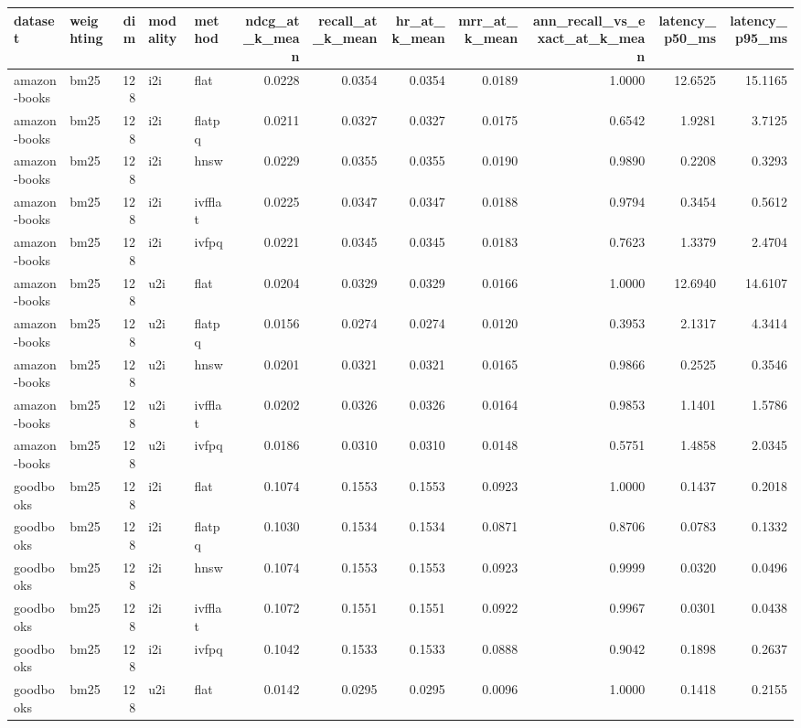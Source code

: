 \begin{tabular}{llrllrrrrrrr}
\toprule
dataset & weighting & dim & modality & method & ndcg_at_k_mean & recall_at_k_mean & hr_at_k_mean & mrr_at_k_mean & ann_recall_vs_exact_at_k_mean & latency_p50_ms & latency_p95_ms \\
\midrule
amazon-books & bm25 & 128 & i2i & flat & 0.0228 & 0.0354 & 0.0354 & 0.0189 & 1.0000 & 12.6525 & 15.1165 \\
amazon-books & bm25 & 128 & i2i & flatpq & 0.0211 & 0.0327 & 0.0327 & 0.0175 & 0.6542 & 1.9281 & 3.7125 \\
amazon-books & bm25 & 128 & i2i & hnsw & 0.0229 & 0.0355 & 0.0355 & 0.0190 & 0.9890 & 0.2208 & 0.3293 \\
amazon-books & bm25 & 128 & i2i & ivfflat & 0.0225 & 0.0347 & 0.0347 & 0.0188 & 0.9794 & 0.3454 & 0.5612 \\
amazon-books & bm25 & 128 & i2i & ivfpq & 0.0221 & 0.0345 & 0.0345 & 0.0183 & 0.7623 & 1.3379 & 2.4704 \\
amazon-books & bm25 & 128 & u2i & flat & 0.0204 & 0.0329 & 0.0329 & 0.0166 & 1.0000 & 12.6940 & 14.6107 \\
amazon-books & bm25 & 128 & u2i & flatpq & 0.0156 & 0.0274 & 0.0274 & 0.0120 & 0.3953 & 2.1317 & 4.3414 \\
amazon-books & bm25 & 128 & u2i & hnsw & 0.0201 & 0.0321 & 0.0321 & 0.0165 & 0.9866 & 0.2525 & 0.3546 \\
amazon-books & bm25 & 128 & u2i & ivfflat & 0.0202 & 0.0326 & 0.0326 & 0.0164 & 0.9853 & 1.1401 & 1.5786 \\
amazon-books & bm25 & 128 & u2i & ivfpq & 0.0186 & 0.0310 & 0.0310 & 0.0148 & 0.5751 & 1.4858 & 2.0345 \\
goodbooks & bm25 & 128 & i2i & flat & 0.1074 & 0.1553 & 0.1553 & 0.0923 & 1.0000 & 0.1437 & 0.2018 \\
goodbooks & bm25 & 128 & i2i & flatpq & 0.1030 & 0.1534 & 0.1534 & 0.0871 & 0.8706 & 0.0783 & 0.1332 \\
goodbooks & bm25 & 128 & i2i & hnsw & 0.1074 & 0.1553 & 0.1553 & 0.0923 & 0.9999 & 0.0320 & 0.0496 \\
goodbooks & bm25 & 128 & i2i & ivfflat & 0.1072 & 0.1551 & 0.1551 & 0.0922 & 0.9967 & 0.0301 & 0.0438 \\
goodbooks & bm25 & 128 & i2i & ivfpq & 0.1042 & 0.1533 & 0.1533 & 0.0888 & 0.9042 & 0.1898 & 0.2637 \\
goodbooks & bm25 & 128 & u2i & flat & 0.0142 & 0.0295 & 0.0295 & 0.0096 & 1.0000 & 0.1418 & 0.2155 \\

\end{tabular}
